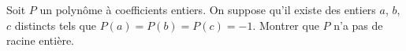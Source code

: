 Soit $P$ un polynôme à coefficients entiers. On suppose qu'il existe des entiers $a$, $b$, $c$ distincts tels que $P(a) = P(b) = P(c) = -1$. Montrer que $P$ n'a pas de racine entière.
